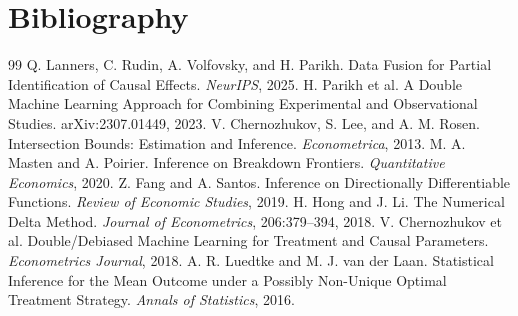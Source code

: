 \documentclass[11pt]{article}
\theoremstyle{definition}
\theoremstyle{plain}
\theoremstyle{remark}
\begin{document}
\section*{Bibliography}
\begin{thebibliography}{99}
 Q. Lanners, C. Rudin, A. Volfovsky, and H. Parikh. Data Fusion for Partial Identification of Causal Effects. \emph{NeurIPS}, 2025.
 H. Parikh et al. A Double Machine Learning Approach for Combining Experimental and Observational Studies. arXiv:2307.01449, 2023.
 V. Chernozhukov, S. Lee, and A. M. Rosen. Intersection Bounds: Estimation and Inference. \emph{Econometrica}, 2013.
 M. A. Masten and A. Poirier. Inference on Breakdown Frontiers. \emph{Quantitative Economics}, 2020.
 Z. Fang and A. Santos. Inference on Directionally Differentiable Functions. \emph{Review of Economic Studies}, 2019.
 H. Hong and J. Li. The Numerical Delta Method. \emph{Journal of Econometrics}, 206:379--394, 2018.
 V. Chernozhukov et al. Double/Debiased Machine Learning for Treatment and Causal Parameters. \emph{Econometrics Journal}, 2018.
 A. R. Luedtke and M. J. van der Laan. Statistical Inference for the Mean Outcome under a Possibly Non-Unique Optimal Treatment Strategy. \emph{Annals of Statistics}, 2016.
\end{thebibliography}
\end{document}

